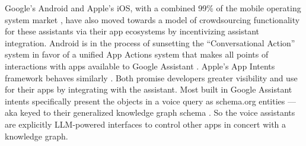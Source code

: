 Google's Android and Apple's iOS, with a combined 99\% of the mobile
operating system market \cite{statistaGlobalMobileOS2023} , have
also moved towards a model of crowdsourcing functionality for these
assistants via their app ecosystems by incentivizing assistant
integration.
Android is in the process of sunsetting the ``Conversational Action''
system in favor of a unified App Actions system that makes all points of
interactions with apps available to Google Assistant \cite{nathensonHelpingDevelopersCreate2022} . Apple's App Intents framework
behaves similarly \cite{appledeveloperdocumentationAppIntents} .
Both promise developers greater visibility and use for their apps by
integrating with the assistant. Most built in Google Assistant intents
specifically present the objects in a voice query as schema.org entities
--- aka keyed to their generalized knowledge graph schema \cite{androiddeveloperdocumentationBuildAppActions} . So the voice
assistants are explicitly LLM-powered interfaces to control other apps
in concert with a knowledge graph.

